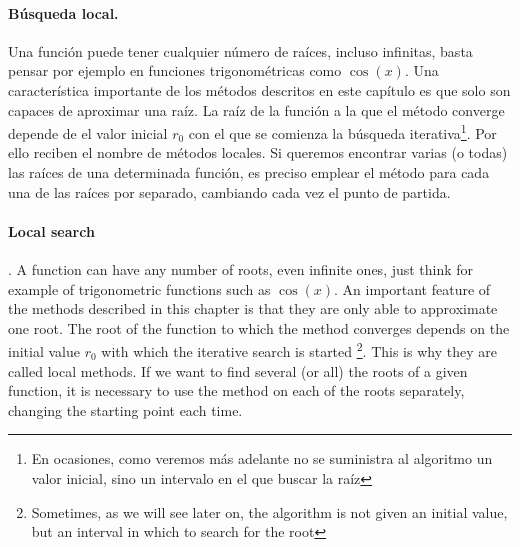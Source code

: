 \begin{paracol}{2}
\paragraph*{Búsqueda local.} Una función puede tener cualquier número de raíces, incluso infinitas, basta pensar por ejemplo en funciones trigonométricas como $\cos(x)$. Una característica importante de los métodos descritos en este capítulo es que solo son capaces de aproximar una raíz. La raíz de la función a la que el método converge depende de el valor inicial $r_0$ con el que se comienza la búsqueda iterativa\footnote{En ocasiones, como veremos más adelante no se suministra al algoritmo un valor inicial, sino un intervalo en el que buscar la raíz}. Por ello reciben el nombre de métodos locales. Si queremos encontrar varias (o todas) las raíces de una determinada función, es preciso emplear el método para cada una de las raíces por separado, cambiando cada vez el punto de partida.
\switchcolumn

\paragraph*{Local search}. A function can have any number of roots, even infinite ones, just think for example of trigonometric functions such as $\cos(x)$. An important feature of the methods described in this chapter is that they are only able to approximate one root. The root of the function to which the method converges depends on the initial value $r_0$ with which the iterative search is started \footnote{Sometimes, as we will see later on, the algorithm is not given an initial value, but an interval in which to search for the root}. This is why they are called local methods. If we want to find several (or all) the roots of a given function, it is necessary to use the method on each of the roots separately, changing the starting point each time.
\end{paracol}

